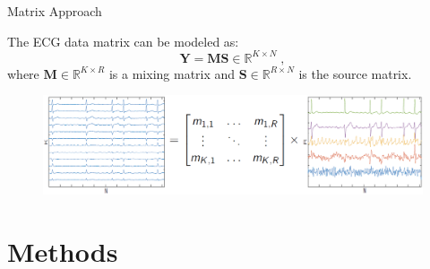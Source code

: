 \documentclass{beamer}
\begin{document}
	\begin{frame}{Matrix Approach}
	
		The ECG data matrix can be modeled as:
		\begin{equation}
			\textbf{Y} = \textbf{MS} \in \mathbb{R}^{K \times N} \; ,
		\end{equation}
		where ${\textbf{M}} \in {\mathbb{R}}^{K \times R}$ is a mixing matrix and $\textbf{S} \in {\mathbb{R}}^{R \times N}$ is the source matrix.	
		\vspace{-0.4cm}
		\begin{figure}[htb]
			\centering
			\includegraphics[scale=0.5]{fig/bss_fig.png}
		\end{figure}
	\end{frame}
		
\section{Methods}
\end{document}
